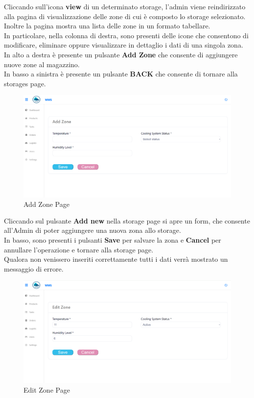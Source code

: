 Cliccando sull'icona \textbf{view} di un determinato storage, l’admin viene
reindirizzato alla pagina di visualizzazione delle zone di cui è composto lo storage selezionato.\\
Inoltre la pagina mostra una lista delle zone in un formato tabellare. \\
In particolare, nella colonna di destra, sono presenti delle icone che consentono di modificare, eliminare oppure
visualizzare in dettaglio i dati di una singola zona.\\
In alto a destra è presente un pulsante \textbf{Add Zone} che consente di aggiungere nuove zone al magazzino.\\
In basso a sinistra è presente un pulsante \textbf{BACK} che consente di tornare alla storages page.

\begin{figure}[H]
    \centering
    \includegraphics[width=\textwidth]{document/sections/img/Storyboard/addZone.png}
    \caption{Add Zone Page}
    \label{fig:addZonePages}
\end{figure}

Cliccando sul pulsante \textbf{Add new} nella storage page si apre un form, che consente
all'Admin di poter aggiungere una nuova zona allo storage.\\
In basso, sono presenti i pulsanti \textbf{Save} per salvare la zona e \textbf{Cancel} per annullare l'operazione
e tornare alla storage page.\\
Qualora non venissero inseriti correttamente tutti i dati verrà mostrato un messaggio di errore.

\begin{figure}[H]
    \centering
    \includegraphics[width=\textwidth]{document/sections/img/Storyboard/editZonePage.png}
    \caption{Edit Zone Page}
    \label{fig:editZonePage}
\end{figure}


